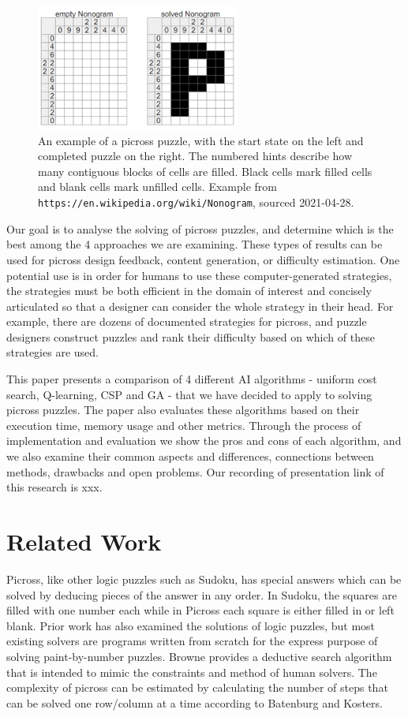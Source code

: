\documentclass{svproc}
\begin{document}
\begin{figure}[h]
  \centering
  \includegraphics[width=0.6\textwidth]{picross1.png}
  \caption{An example of a picross puzzle, with the start state on the left and completed puzzle on the right. The numbered hints describe how many contiguous blocks of cells are filled. Black cells mark filled cells and blank cells mark unfilled cells. Example from \texttt{https://en.wikipedia.org/wiki/Nonogram}, sourced 2021-04-28.}
\end{figure}

Our goal is to analyse the solving of picross puzzles, and determine which is the best among the 4 approaches we are examining. These types of results can be used for picross design feedback, content generation, or difficulty estimation. One potential use is in order for humans to use these computer-generated strategies, the strategies must be both efficient in the domain of interest and concisely articulated so that a designer can consider the whole strategy in their head. For example, there are dozens of documented strategies for picross\cite{picross1}, and puzzle designers construct puzzles and rank their difficulty based on which of these strategies are used\cite{picross2}.

This paper presents a comparison of 4 different AI algorithms - uniform cost search, Q-learning, CSP and GA - that we  have decided to apply to solving picross puzzles. The paper also evaluates these algorithms based on their execution time, memory usage and other metrics. Through the process of implementation and evaluation we show the pros and cons of each algorithm, and we also examine their common aspects and differences, connections between methods, drawbacks and open problems. Our recording of presentation link of this research is xxx.


\section{Related Work}
Picross, like other logic puzzles such as Sudoku, has special answers which can be solved by deducing pieces of the answer in any order. In Sudoku, the squares are filled with one number each while in Picross each square is either filled in or left blank. Prior work has also examined the solutions of logic puzzles, but most existing solvers are programs written from scratch for the express purpose of solving paint-by-number puzzles\cite{5.1.1,5.1.2,5.1.3,5.1.7}. Browne provides a deductive search algorithm that is intended to mimic the constraints and method of human solvers\cite{Browne}. The complexity of picross can be estimated by calculating the number of steps that can be solved one row/column at a time according to Batenburg and Kosters\cite{Batenburg and Kosters}.
\end{document}
